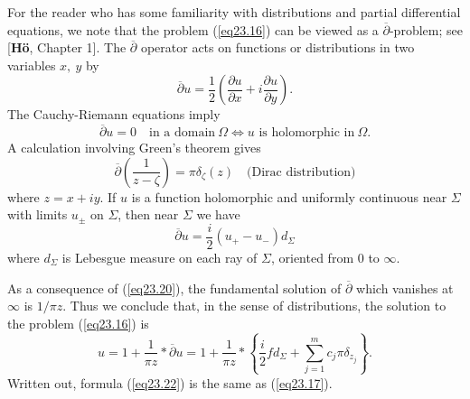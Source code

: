\documentclass{surv-l}
\theoremstyle{plain}
\theoremstyle{definition}
\numberwithin{equation}{chapter}
\begin{document}
For the reader who has some familiarity with distributions and partial differential equations, we note that the problem (\ref{eq23.16}) can be viewed as a $\overline{\partial}$-problem;  see [\textbf{H\"{o}}, Chapter 1]. The $\overline{\partial}$ operator acts on functions or distributions in two variables $x,\ y$ by
\renewcommand\theequation{23.18}
\setcounter{equation}{17}
\begin{equation}\label{eq23.18}
\overline{\partial}u=\frac{1}{2}\left(\frac{\partial u}{\partial x}+i\frac{\partial u}{\partial y}\right).
\end{equation}
The Cauchy-Riemann equations imply
\renewcommand\theequation{23.19}
\setcounter{equation}{18}
\begin{equation}\label{eq23.19}
\overline{\partial}u=0\quad \text{in a domain}\ \Omega\Leftrightarrow u \text{ is holomorphic in}\ \Omega.
\end{equation}
A calculation involving Green's theorem gives
\renewcommand\theequation{23.20}
\setcounter{equation}{19}
\begin{equation}\label{eq23.20}
\overline{\partial}\left(\frac{1}{z-\zeta}\right)=\pi\delta_{\zeta}(z)\quad \text{(Dirac distribution)}
\end{equation}
where $z=x+iy$. If $u$ is a function holomorphic and uniformly continuous near $\Sigma$ with limits $u_{\pm}$ on $\Sigma$, then near $\Sigma$ we have
\renewcommand\theequation{23.21}
\setcounter{equation}{20}
\begin{equation}\label{eq23.21}
\overline{\partial}u=\frac{i}{2}(u_{+}-u_{-})d_{\Sigma}
\end{equation}
where $d_{\Sigma}$ is Lebesgue measure on each ray of $\Sigma$, oriented from $0$ to $\infty$.

As a consequence of (\ref{eq23.20}), the fundamental solution of $\overline{\partial}$ which vanishes at $\infty$ is $1/\pi z$. Thus we conclude that, in the sense of distributions, the solution to the problem (\ref{eq23.16}) is
\renewcommand\theequation{23.22}
\setcounter{equation}{21}
\begin{equation}\label{eq23.22}
u=1+\frac{1}{\pi z}\ast\overline{\partial}u=1+\frac{1}{\pi z} \ast\left\{\frac{i}{2}fd_{\Sigma}+\sum_{j=1}^{m}c_{j}\pi\delta_{z_{j}}\right\}.
\end{equation}
Written out, formula (\ref{eq23.22}) is the same as (\ref{eq23.17}).
\end{document}
